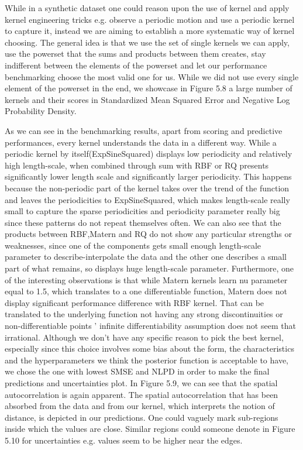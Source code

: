 \documentclass[12pt,a4paper,oneside]{book}
\theoremstyle{plain}
\theoremstyle{definition}
\begin{document}
{\vspace{2mm}
\noindent
While in a synthetic dataset one could reason upon the use of kernel and apply kernel engineering tricks e.g. observe a periodic motion and use a periodic kernel to capture it, instead we are aiming to establish a more systematic way of kernel choosing. The general idea is that we use the set of single kernels we can apply, use the powerset that the sums and products between them creates, stay indifferent between the elements of the powerset and let our performance benchmarking choose the most valid one for us. While we did not use every single element of the powerset in  the end, we showcase in Figure 5.8 a large number of kernels and their scores in Standardized Mean Squared Error and Negative Log Probability Density.
 
\vspace{2mm}
\noindent
As we can see in the benchmarking results, apart from scoring and predictive performances, every kernel understands the data in a different way. While a periodic kernel by itself(ExpSineSquared) displays low periodicity and relatively high length-scale, when combined through sum with RBF or RQ presents significantly lower length scale and significantly larger periodicity. This happens because the non-periodic part of the kernel takes over the trend of the function and leaves the periodicities to ExpSineSquared, which makes length-scale really small to capture the sparse periodicities and periodicity parameter really big since these patterns do not repeat themselves often. We can also see that the products between RBF,Matern and RQ do not show any particular strengths or weaknesses, since one of the components gets small enough length-scale parameter to describe-interpolate the data and the other one describes a small part of what remains, so displays huge length-scale parameter. Furthermore, one of the interesting observations is that while Matern kernels learn nu parameter equal to 1.5, which translates to a one differentiable function, Matern does not display significant performance difference with RBF kernel. That can be translated to the underlying function not having any strong discontinuities or non-differentiable points ' infinite differentiability assumption does not seem that irrational. Although we don't have any specific reason to pick the best kernel, especially since this choice involves some bias about the form, the characteristics and the hyperparameters we think the posterior function is acceptable to have, we chose the one with lowest SMSE and NLPD in order to make the final predictions and uncertainties plot. In Figure 5.9, we can see that the spatial autocorrelation is again apparent. The spatial autocorrelation that has been absorbed from the data and from our kernel, which interprets the notion of distance, is depicted in our predictions. One could vaguely mark sub-regions inside which the values are close. Similar regions could someone denote in Figure 5.10 for uncertainties e.g. values seem to be higher near the edges.

}
\end{document}
